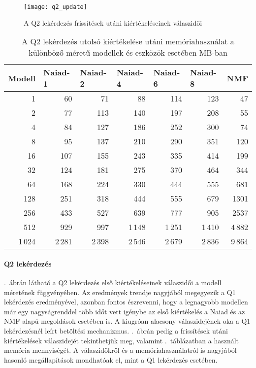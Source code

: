 \begin{figure}[htb]
	\centering
	\texttt{[image: q2\_update]}
	\caption{A Q2 lekérdezés frissítések utáni kiértékeléseinek válaszidői}
	\label{fig:q2_update}
\end{figure}

\begin{table}[htb]
	\centering
	\begin{tabular}{rrrrrrr}
		\toprule
		\multicolumn{1}{l}{Modell} & \multicolumn{1}{l}{Naiad-1} & \multicolumn{1}{l}{Naiad-2}& \multicolumn{1}{l}{Naiad-4} & \multicolumn{1}{l}{Naiad-6} & \multicolumn{1}{l}{Naiad-8}& \multicolumn{1}{l}{NMF} \\
		\midrule
		1 & 60 & 71 & 88 & 114 & 123 & 47 \\
		2 & 77 & 113 & 140 & 197 & 208 & 55 \\
		4 & 84 & 127 & 186 & 252 & 300 & 74 \\
		8 & 95 & 137 & 210 & 290 & 351 & 120 \\
		16 & 107 & 155 & 243 & 335 & 414 & 199 \\
		32 & 124 & 181 & 275 & 370 & 464 & 344 \\
		64 & 168 & 224 & 330 & 444 & 555 & 681 \\
		128 & 251 & 318 & 444 & 555 & 679 & 1301 \\
		256 & 433 & 527 & 639 & 777 & 905 & 2537 \\
		512 & 929 & 997 & 1\,148 & 1\,251 & 1\,410 & 4\,882 \\
		1\,024 & 2\,281 & 2\,398 & 2\,546 & 2\,679 & 2\,836 & 9\,864 \\
		\bottomrule
	\end{tabular}
	\caption{A Q2 lekérdezés utolsó kiértékelése utáni memóriahasználat a különböző méretű modellek és eszközök esetében MB-ban}
	\label{tab:q2-memory}
\end{table}

\paragraph{Q2 lekérdezés}

.~ábrán látható a Q2 lekérdezés első kiértékeléseinek válaszidői a modell méretének függvényében. Az eredmények trendje nagyjából megegyezik a Q1 lekérdezés eredményével, azonban fontos észrevenni, hogy a legnagyobb modellen már egy nagyságrenddel több időt vett igénybe az első kiértékelés a Naiad és az NMF alapú megoldások esetében is. A \viatra kiugróan alacsony válaszidejének oka a Q1 lekérdezésnél leírt betöltési mechanizmus. .~ábrán pedig a frissítések utáni kiértékelések válaszidejét tekinthetjük meg, valamint .~táblázatban a használt memória mennyiségét. A válaszidőkről és a memóriahasználatról is nagyjából hasonló megállapítások mondhatóak el, mint a Q1 lekérdezés esetében.

